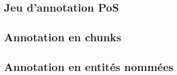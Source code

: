 \documentclass[manual-fr.tex]{subfiles}
\begin{document}
\subsection{\FTBFull}


\subsection{Jeu d'annotation PoS}


\subsection{Annotation en chunks}


\subsection{Annotation en entités nommées}


\subsection{\LeFFFFull}

\end{document}
